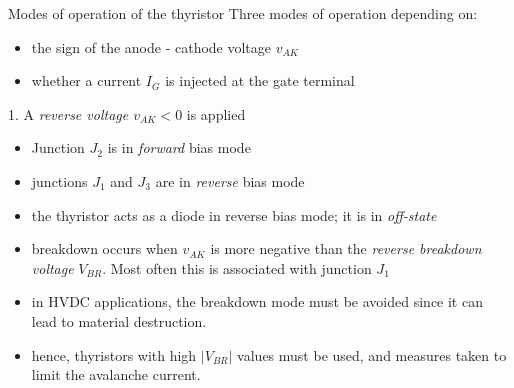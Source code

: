 \begin{frame}{Modes of operation of the thyristor}
Three modes of operation depending on:
\begin{itemize}
    \item the sign of the anode - cathode voltage $v_{AK}$
    \item whether a current $I_G$ is injected at the gate terminal
\end{itemize}
\end{frame}
\begin{frame}{1. A \textit{reverse voltage $v_{AK}<0$} is applied}
\begin{itemize}
    \item Junction $J_2$ is in \textit{forward} bias mode
    \item junctions $J_1$ and $J_3$ are in \textit{reverse} bias mode
    \item the thyristor acts as a diode in reverse bias mode; it is in \textit{off-state}
    \item breakdown occurs when $v_{AK}$ is more negative than the \textit{reverse breakdown voltage} $V_{BR}$. Most often this is associated with junction $J_1$
    \item in HVDC applications, the breakdown mode must be avoided since it can lead to material destruction.
    \item hence, thyristors with high $|V_{BR}|$ values must be used, and measures taken to limit the avalanche current.
\end{itemize}

\end{frame}
